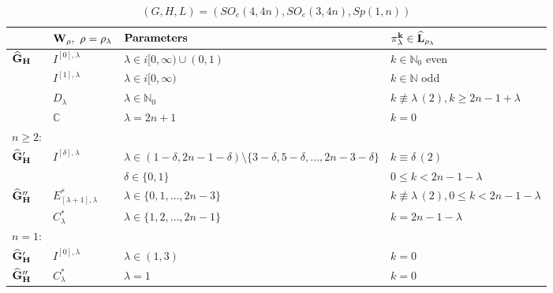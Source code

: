 \documentclass[10]{amsart}
\theoremstyle{remark}
\theoremstyle{definition}
\numberwithin{equation}{section}
\newcommand{\C}{\mathbb{C}}           %
\newcommand{\N}{\mathbb{N}}           %
\begin{document}
{\begin{table}[h]
\caption{$(G,H,L)=(SO_e(4,4n),SO_e(3,4n), Sp(1,n))$}\label{fluous}
\begin{center}
\renewcommand{\arraystretch}{1.3}
\begin{tabular}{|l||l||l||l|}
  \hline
  &${\bf W_\rho,\ \rho=\rho_\lambda}$ & ${\bf Parameters}$ & ${\bf \pi^k_\lambda\in\widehat L_{\rho_\lambda}}$\\
  \hline
    \hline
  ${\bf \widehat G_H}$& $I^{[0],\lambda}$ & $\lambda\in i[0,\infty)\cup (0,1)$ & $k\in\N_0$ even  \\
    \hline
  &$I^{[1],\lambda}$& $\lambda\in i[0,\infty)$ & $k\in \N$ odd\\
\hline
&$D_\lambda$ &$\lambda\in\N_0$&$ k\not\equiv \lambda\, (2), k\ge 2n-1+\lambda$ \\
\hline
&$\C$ &$\lambda=2n+1$ & $ k=0$\\
   \hline
$n\ge 2$:\\
    \hline
${\bf \widehat G_H'}$&$I^{[\delta],\lambda}$& $\lambda\in (1-\delta,2n-1-\delta)\setminus\{3-\delta,5-\delta,\dots,2n-3-\delta\}$ & $k\equiv\delta\, (2)$ \\
&&$\delta\in\{0,1\}$&$ 0\le k<2n-1-\lambda$\\
 \hline
    \hline
${\bf \widehat G_H''}$&$E_{[\lambda+1],\lambda}^*$&$\lambda\in\{0,1,\dots,2n-3\}$&$k\not\equiv \lambda\, (2), 0\le k<2n-1-\lambda$ \\
\hline
&$C_\lambda^*$&$\lambda\in\{1,2,\dots,2n-1\}$&$k=2n-1-\lambda$\\
\hline
$n=1$:\\
  \hline
${\bf \widehat G_H'}$&$I^{[0],\lambda}$& $\lambda\in (1,3)$ & $k=0$ \\
 \hline
    \hline
${\bf \widehat G_H''}$&$C_\lambda^*$&$\lambda=1$&$k=0$\\
\hline
\end{tabular}
\end{center}
\end{table}

}
\end{document}
